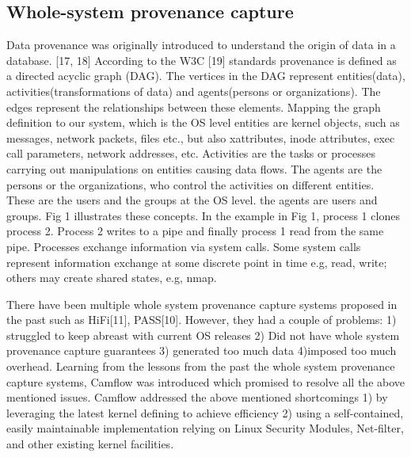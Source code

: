 \subsection{Whole-system provenance capture}
\label{A little about the graphs}
Data provenance was originally introduced to understand the origin of data in a database. [17, 18] According to the W3C [19] standards provenance is defined as a directed acyclic graph (DAG). The vertices in the DAG represent entities(data), activities(transformations of data) and agents(persons or organizations). The edges represent the relationships between these elements. Mapping the graph definition to our system, which is the OS level entities are kernel objects, such as messages, network packets, files etc., but also xattributes, inode attributes, exec call parameters, network addresses, etc.
Activities are the tasks or processes carrying out manipulations on entities causing data flows. The agents are the persons or the organizations, who control the activities on different entities. These are the users and the groups at the OS level. 
 the agents are users and groups. Fig 1 illustrates these concepts. In the example in Fig 1, process 1 clones process 2. Process 2 writes to a pipe and finally process 1 read from the same pipe.
\vskip 0.1in 
Processes exchange information via system calls. Some system calls represent information exchange at some discrete point in time e.g, read, write; others may create shared states, e.g, nmap.


\label{A small recap into data provenance and whole system provenance capture}
\vskip 0.1in
There have been multiple whole system provenance capture systems proposed in the past such as HiFi[11], PASS[10]. However, they had a couple of problems: 1) struggled to keep abreast with current OS releases 2) Did not have whole system provenance capture guarantees 3) generated too much data 4)imposed too much overhead. Learning from the lessons from the past the whole system provenance capture systems, Camflow was introduced which promised to resolve all the above mentioned issues. Camflow addressed the above mentioned shortcomings 1) by leveraging the latest kernel defining to achieve efficiency 2) using a self-contained, easily maintainable implementation relying on Linux Security Modules, Net-filter, and other existing kernel facilities.


